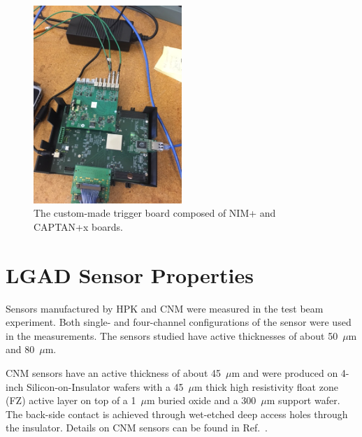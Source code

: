 \documentclass[preprint,1p]{elsarticle}
\begin{document}
\begin{figure}[htbp] 
\centering
\includegraphics[width=0.5\textwidth, angle=270]{figs/CAPTAN_NIM_Plus.JPG} 
\caption{The custom-made trigger board composed of NIM+ and CAPTAN+x boards.} 
\label{fig:NIM+Captan} 
\end{figure} 



\section{LGAD Sensor Properties}
\label{sec:sensors}

Sensors manufactured by HPK and CNM were measured in the test beam
experiment. Both single- and four-channel configurations of the sensor were used
in the measurements. The sensors studied have active thicknesses of
about 50~$\mu$m and 80~$\mu$m. 


CNM sensors have an active thickness of about 45~$\mu$m and were
produced on 4-inch Silicon-on-Insulator wafers with a 45~$\mu$m thick high
resistivity float zone (FZ) active layer on top of a 1~$\mu$m buried oxide and a
300~$\mu$m support wafer. The back-side contact is achieved through wet-etched deep
access holes through the insulator. Details on CNM sensors can be found in
Ref.~\cite{CNMSensors, Cartiglia201783}. 
\end{document}
